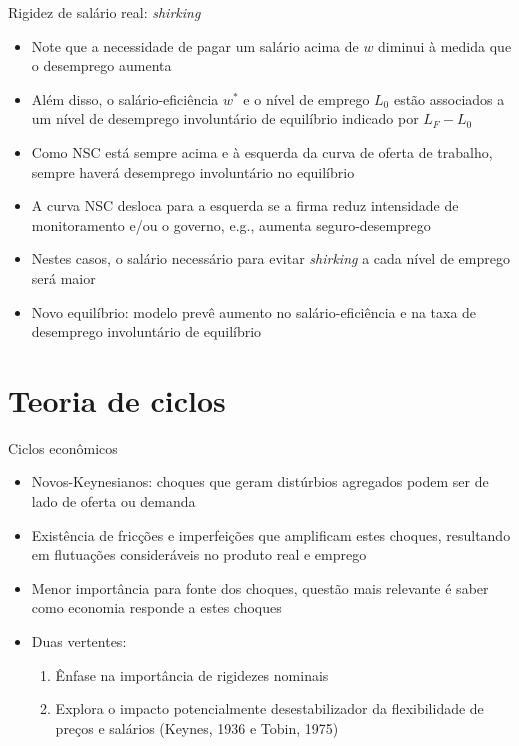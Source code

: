 \documentclass[10pt]{beamer}
\begin{document}
\begin{frame}{Rigidez de salário real: \emph{shirking}}
    \begin{itemize}
        \item Note que a necessidade de pagar um salário acima de $w$ diminui à medida que o desemprego aumenta\bigskip
        \item Além disso, o salário-eficiência $w^*$ e o nível de emprego $L_0$ estão associados a um nível de desemprego involuntário de equilíbrio indicado por $L_F - L_0$\bigskip
        \item Como NSC está sempre acima e à esquerda da curva de oferta de trabalho, sempre haverá desemprego involuntário no equilíbrio\bigskip
        \item A curva NSC desloca para a esquerda se a firma reduz intensidade de monitoramento e/ou o governo, e.g., aumenta seguro-desemprego\bigskip
        \item Nestes casos, o salário necessário para evitar \emph{shirking} a cada nível de emprego será maior\bigskip
        \item Novo equilíbrio: modelo prevê aumento no salário-eficiência e na taxa de desemprego involuntário de equilíbrio
    \end{itemize}
\end{frame}

\section{Teoria de ciclos}
\begin{frame}{Ciclos econômicos}
    \begin{itemize}
        \item Novos-Keynesianos: choques que geram distúrbios agregados podem ser de lado de oferta ou demanda \bigskip
        \item Existência de fricções e imperfeições que amplificam estes choques, resultando em flutuações consideráveis no produto real e emprego \bigskip
        \item Menor importância para fonte dos choques, questão mais relevante é saber como economia responde a estes choques\bigskip
        \item Duas vertentes:\bigskip
        \begin{enumerate}
            \item Ênfase na importância de rigidezes nominais\bigskip
            \item Explora o impacto potencialmente desestabilizador da flexibilidade de preços e salários (Keynes, 1936 e Tobin, 1975)
        \end{enumerate}
    \end{itemize}    
\end{frame}
\end{document}
